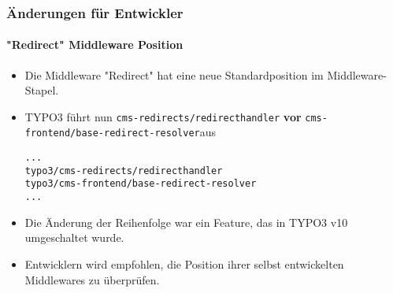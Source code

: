 %

\begin{frame}[fragile]
	\frametitle{Änderungen für Entwickler}
	\framesubtitle{"Redirect" Middleware Position}

	\lstset{basicstyle=\tiny\ttfamily}

	\begin{itemize}
		\item Die Middleware "Redirect" hat eine neue Standardposition im Middleware-Stapel.
		\item TYPO3 führt nun
			\small\texttt{cms-redirects/redirecthandler}\normalsize\newline
			\textbf{vor}
			\texttt{cms-frontend/base-redirect-resolver}\normalsize aus
\begin{lstlisting}
...
typo3/cms-redirects/redirecthandler
typo3/cms-frontend/base-redirect-resolver
...
\end{lstlisting}

		\item Die Änderung der Reihenfolge war ein Feature, das in TYPO3 v10 umgeschaltet wurde.
		\item Entwicklern wird empfohlen, die Position ihrer selbst entwickelten Middlewares zu überprüfen.

	\end{itemize}

\end{frame}

